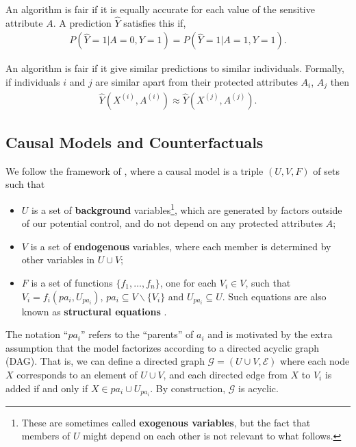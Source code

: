 \begin{define}
An algorithm is fair if it is equally accurate for each value of the sensitive attribute $A$. A prediction $\hat{Y}$ satisfies this if,
\begin{align}
P(\hat{Y}=1 | A=0,Y=1) = P(\hat{Y}=1 | A=1,Y=1). \nonumber
\end{align}
\end{define}

\begin{define}
  An algorithm is fair if it give similar predictions to similar
  individuals. Formally, if individuals $i$ and $j$ are similar apart from their protected attributes $A_i$, $A_j$ then
\begin{align}
  \hat{Y}(X^{(i)}, A^{(i)}) \approx \hat{Y}(X^{(j)}, A^{(j)}).\nonumber
\end{align}
\end{define}


\subsection{Causal Models and Counterfactuals}
\label{subsec:cmc}
We  follow the framework of \citet{pearl:00}, where a causal
model is a triple $(U, V, F)$ of sets such that
\begin{itemize}
\item $U$ is a set of {\bf background} variables\footnote{These are
  sometimes called {\bf exogenous variables}, but the fact that members of $U$
  might depend on each other is not relevant to what follows.}, which are generated by factors
outside of our potential control, and do not depend on any protected attributes $A$;
\item $V$ is a set of {\bf endogenous} variables, where each member is determined by
  other variables in $U \cup V$;
\item $F$ is a set of functions $\{f_1, \dots, f_n\}$, one for each $V_i \in V$, such
that $V_i = f_i(pa_i, U_{pa_i})$, $pa_i \subseteq V \backslash
\{V_i\}$ and $U_{pa_i} \subseteq U$. Such equations are also known as
{\bf structural equations} \citep{bol:89}.
\end{itemize}

The notation ``$pa_i$'' refers to the ``parents'' of $a_i$ and is motivated by the extra assumption that the
model factorizes according to a directed acyclic graph (DAG). That is, we can
define a directed graph ${\mathcal G}=(U \cup V, \mathcal E )$ where each node $X$ corresponds to an
element of $U \cup V$, and each directed edge from $X$ to $V_i$ is added if
and only if $X \in pa_i \cup U_{pa_i}$. By construction, $\mathcal G$ is
acyclic.

